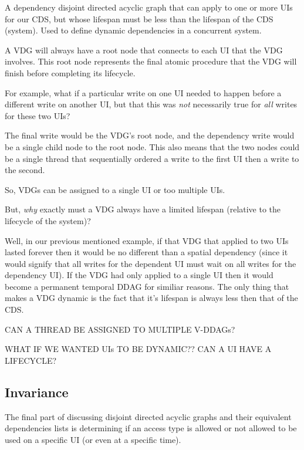 \begin{con-def}
	\label{thread}
	A dependency disjoint directed acyclic graph that can apply to one or more UIs for our CDS, but whose lifespan must be less than the lifespan of the CDS (system). Used to define dynamic dependencies in a concurrent system.
\end{con-def}

A VDG will always have a root node that connects to each UI that the VDG involves. This root node represents the final atomic procedure that the VDG will finish before completing its lifecycle.

For example, what if a particular write on one UI needed to happen before a different write on another UI, but that this was \textit{not} necessarily true for \textit{all} writes for these two UIs?

The final write would be the VDG's root node, and the dependency write would be a single child node to the root node. This also means that the two nodes could be a single thread that sequentially ordered a write to the first UI then a write to the second.

So, VDGs can be assigned to a single UI or too multiple UIs. 

But, \textit{why} exactly must a VDG always have a limited lifespan (relative to the lifecycle of the system)? 

Well, in our previous mentioned example, if that VDG that applied to two UIs lasted forever then it would be no different than a spatial dependency (since it would signify that all writes for the dependent UI must wait on all writes for the dependency UI). If the VDG had only applied to a single UI then it would become a permanent temporal DDAG for similiar reasons. The only thing that makes a VDG dynamic is the fact that it's lifespan is always less then that of the CDS.

CAN A THREAD BE ASSIGNED TO MULTIPLE V-DDAGs?

WHAT IF WE WANTED UIs TO BE DYNAMIC?? CAN A UI HAVE A LIFECYCLE?

\subsection{Invariance}

The final part of discussing disjoint directed acyclic graphs and their equivalent dependencies lists is determining if an access type is allowed or not allowed to be used on a specific UI (or even at a specific time).

